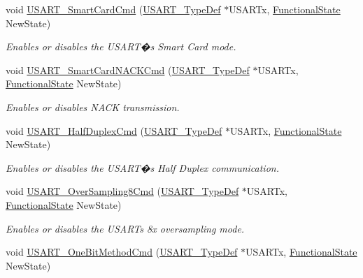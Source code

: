 \begin{DoxyCompactItemize}
void \hyperlink{group___u_s_a_r_t___private___functions_gabd1347e244c623447151ba3a5e986c5f}{U\+S\+A\+R\+T\+\_\+\+Smart\+Card\+Cmd} (\hyperlink{struct_u_s_a_r_t___type_def}{U\+S\+A\+R\+T\+\_\+\+Type\+Def} $\ast$U\+S\+A\+R\+Tx, \hyperlink{group___exported__types_gac9a7e9a35d2513ec15c3b537aaa4fba1}{Functional\+State} New\+State)
\begin{DoxyCompactList}\small\item\em Enables or disables the U\+S\+A\+R\+T�s Smart Card mode. \end{DoxyCompactList}\item 
void \hyperlink{group___u_s_a_r_t___private___functions_ga62e22f47e38aa53f2edce8771f7a5dfa}{U\+S\+A\+R\+T\+\_\+\+Smart\+Card\+N\+A\+C\+K\+Cmd} (\hyperlink{struct_u_s_a_r_t___type_def}{U\+S\+A\+R\+T\+\_\+\+Type\+Def} $\ast$U\+S\+A\+R\+Tx, \hyperlink{group___exported__types_gac9a7e9a35d2513ec15c3b537aaa4fba1}{Functional\+State} New\+State)
\begin{DoxyCompactList}\small\item\em Enables or disables N\+A\+CK transmission. \end{DoxyCompactList}\item 
void \hyperlink{group___u_s_a_r_t___private___functions_gaaa23b05fe0e1896bad90da7f82750831}{U\+S\+A\+R\+T\+\_\+\+Half\+Duplex\+Cmd} (\hyperlink{struct_u_s_a_r_t___type_def}{U\+S\+A\+R\+T\+\_\+\+Type\+Def} $\ast$U\+S\+A\+R\+Tx, \hyperlink{group___exported__types_gac9a7e9a35d2513ec15c3b537aaa4fba1}{Functional\+State} New\+State)
\begin{DoxyCompactList}\small\item\em Enables or disables the U\+S\+A\+R\+T�s Half Duplex communication. \end{DoxyCompactList}\item 
void \hyperlink{group___u_s_a_r_t___private___functions_ga3897bab07491d9239f8a238a9a7cddea}{U\+S\+A\+R\+T\+\_\+\+Over\+Sampling8\+Cmd} (\hyperlink{struct_u_s_a_r_t___type_def}{U\+S\+A\+R\+T\+\_\+\+Type\+Def} $\ast$U\+S\+A\+R\+Tx, \hyperlink{group___exported__types_gac9a7e9a35d2513ec15c3b537aaa4fba1}{Functional\+State} New\+State)
\begin{DoxyCompactList}\small\item\em Enables or disables the U\+S\+A\+RT\textquotesingle{}s 8x oversampling mode. \end{DoxyCompactList}\item 
void \hyperlink{group___u_s_a_r_t___private___functions_ga3ed89ea8765d851510cfe90f7d90cbbb}{U\+S\+A\+R\+T\+\_\+\+One\+Bit\+Method\+Cmd} (\hyperlink{struct_u_s_a_r_t___type_def}{U\+S\+A\+R\+T\+\_\+\+Type\+Def} $\ast$U\+S\+A\+R\+Tx, \hyperlink{group___exported__types_gac9a7e9a35d2513ec15c3b537aaa4fba1}{Functional\+State} New\+State)

\end{DoxyCompactItemize}
